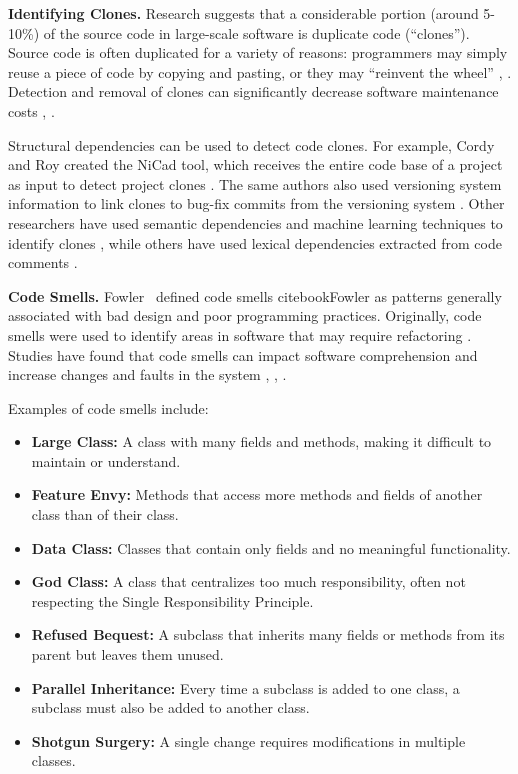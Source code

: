 \textbf{Identifying Clones.} 
Research suggests that a considerable portion (around 5-10\%) of the source code in large-scale software is duplicate code (“clones”). Source code is often duplicated for a variety of reasons: programmers may simply reuse a piece of code by copying and pasting, or they may “reinvent the wheel” \cite{ClonesMayrand}, \cite{clones}. Detection and removal of clones can significantly decrease software maintenance costs \cite{CloneDetection}, \cite{cloneKamiya}.

Structural dependencies can be used to detect code clones. For example, Cordy and Roy created the NiCad tool, which receives the entire code base of a project as input to detect project clones \cite{clones-nicad}. The same authors also used versioning system information to link clones to bug-fix commits from the versioning system \cite{clones-nicad-git}. Other researchers have used semantic dependencies and machine learning techniques to identify clones \cite{clones-ml}, while others have used lexical dependencies extracted from code comments \cite{clones-comments}.

\textbf{Code Smells.}  
Fowler \ defined code smells cite{bookFowler} as patterns generally associated with bad design and poor programming practices. Originally, code smells were used to identify areas in software that may require refactoring \cite{articlesmells}. Studies have found that code smells can impact software comprehension and increase changes and faults in the system \cite{5741260}, \cite{5328703}, \cite{articlefault-proneness}.

Examples of code smells include:

\begin{itemize}
    \item \textbf{Large Class:} A class with many fields and methods, making it difficult to maintain or understand.
    \item \textbf{Feature Envy:} Methods that access more methods and fields of another class than of their class.
    \item \textbf{Data Class:} Classes that contain only fields and no meaningful functionality.
    \item \textbf{God Class:} A class that centralizes too much responsibility, often not respecting the Single Responsibility Principle.
    \item \textbf{Refused Bequest:} A subclass that inherits many fields or methods from its parent but leaves them unused.
    \item \textbf{Parallel Inheritance:} Every time a subclass is added to one class, a subclass must also be added to another class.
    \item \textbf{Shotgun Surgery:} A single change requires modifications in multiple classes.
\end{itemize}

